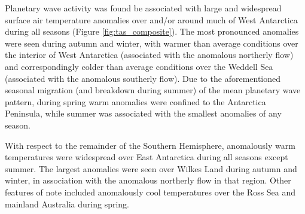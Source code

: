 Planetary wave activity was found be associated with large and widespread surface air temperature anomalies over and/or around much of West Antarctica during all seasons (Figure \ref{fig:tas_composite}). The most pronounced anomalies were seen during autumn and winter, with warmer than average conditions over the interior of West Antarctica (associated with the anomalous northerly flow) and correspondingly colder than average conditions over the Weddell Sea (associated with the anomalous southerly flow). Due to the aforementioned seasonal migration (and breakdown during summer) of the mean planetary wave pattern, during spring warm anomalies were confined to the Antarctica Peninsula, while summer was associated with the smallest anomalies of any season.  

With respect to the remainder of the Southern Hemisphere, anomalously warm temperatures were widespread over East Antarctica during all seasons except summer. The largest anomalies were seen over Wilkes Land during autumn and winter, in association with the anomalous northerly flow in that region. Other features of note included anomalously cool temperatures over the Ross Sea and mainland Australia during spring.
